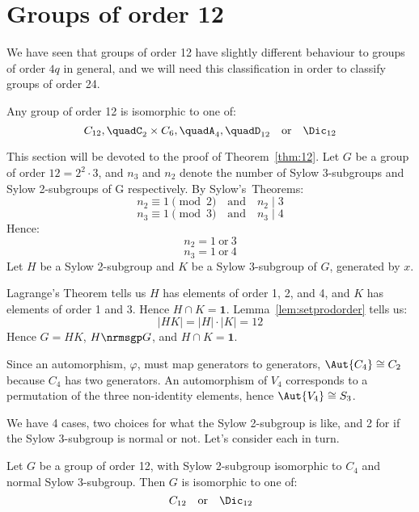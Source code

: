 \section{Groups of order 12}
We have seen that groups of order 12 have slightly different behaviour to groups of order \(4q\) in general, and we will
need this classification in order to classify groups of order 24.

\begin{theorem}\label{thm:12}
    Any group of order 12 is isomorphic to one of:
    \[
        C_{12}, \quad%
        C_2 \times C_6, \quad%
        A_4, \quad%
        D_{12} \quad \text{or} \quad%
        \Dic_{12}
    \]
\end{theorem}

This section will be devoted to the proof of Theorem~\ref{thm:12}.
Let \(G\) be a group of order \(12 = 2^2 \cdot 3\), and \(n_3\) and \(n_2\) denote the number of Sylow 3-subgroups and
Sylow 2-subgroups of G respectively.
By Sylow's~Theorems:
\[n_2 \equiv 1 \pmod{2} \quad \text{and} \quad n_2 \mid 3\]
\[n_3 \equiv 1 \pmod{3} \quad \text{and} \quad n_3 \mid 4\]
Hence:
\[n_2 = 1 \ \text{or} \ 3\]
\[n_3 = 1 \ \text{or} \ 4\]
Let \(H\) be a Sylow 2-subgroup and \(K\) be a Sylow 3-subgroup of \(G\), generated by \(x\).

Lagrange's Theorem tells us \(H\) has elements of order 1, 2, and 4, and \(K\) has elements of order 1 and 3.
Hence \(H \cap K = \bm{1}\).
Lemma~\ref{lem:setprodorder} tells us:
\[|HK| = |H| \cdot |K| = 12\]
Hence \(G = HK\), \(H \nrmsgp G\), and \(H \cap K = \bm{1}\).

Since an automorphism, \(\varphi\), must map generators to generators, \(\Aut{C_4} \cong C_2\) because \(C_4\) has two
generators.
An automorphism of \(V_4\) corresponds to a permutation of the three
non-identity elements, hence \(\Aut{V_4} \cong S_3\).

We have 4 cases, two choices for what the Sylow 2-subgroup is like, and 2 for if the Sylow 3-subgroup is normal or not.
Let's consider each in turn.

\begin{lemma}
    Let \(G\) be a group of order 12, with Sylow 2-subgroup isomorphic to \(C_4\) and normal Sylow 3-subgroup.
    Then \(G\) is isomorphic to one of:
    \[
        C_{12} \quad \text{or} \quad%
        \Dic_{12}
    \]
\end{lemma}

